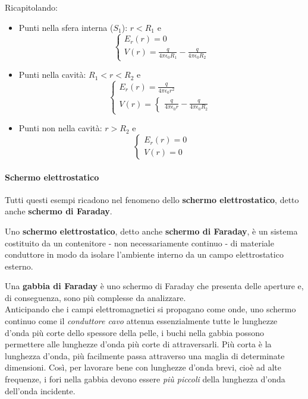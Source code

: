 Ricapitolando:
\begin{itemize}
	\item Punti nella sfera interna ($S_1$): $r<R_1$ e
	\begin{equation*}
		\begin{cases}
			E_{r}(r)=0\\
			V(r)=\frac{q}{4\pi\epsilon_0R_1}-\frac{q}{4\pi\epsilon_0R_2}
		\end{cases}
	\end{equation*}
	\item Punti nella cavità: $R_1<r<R_2$ e
	\begin{equation*}
		\begin{cases}
			E_{r}(r)=\frac{q}{4\pi\epsilon_0 r^2}\\
			V(r)=\begin{cases}
				\frac{q}{4\pi\epsilon_0r}-\frac{q}{4\pi\epsilon_0R_2}
			\end{cases}
		\end{cases}
	\end{equation*}
	\item Punti non nella cavità: $r>R_2$ e
	\begin{equation*}
		\begin{cases}
			E_{r}(r)=0\\
			V(r)=0
		\end{cases}
	\end{equation*}
\end{itemize}

\paragraph{Schermo elettrostatico}
Tutti questi esempi ricadono nel fenomeno dello \textbf{schermo elettrostatico}, detto anche \textbf{schermo di Faraday}.
\begin{define}[lol]
	Uno \textbf{schermo elettrostatico}, detto anche \textbf{schermo di Faraday}, è un sistema costituito da un contenitore - non necessariamente continuo - di materiale conduttore in modo da isolare l'ambiente interno da un campo elettrostatico esterno.
\end{define}
\begin{digressionwt}
	Una \textbf{gabbia di Faraday} è uno schermo di Faraday che presenta delle aperture e, di conseguenza, sono più complesse da analizzare.\\
	Anticipando che i campi elettromagnetici si propagano come onde, uno schermo continuo come il \textit{conduttore cavo} attenua essenzialmente tutte le lunghezze d'onda più corte dello spessore della pelle, i buchi nella gabbia possono permettere alle lunghezze d'onda più corte di attraversarli. Più corta è la lunghezza d'onda, più facilmente passa attraverso una maglia di determinate dimensioni. Così, per lavorare bene con lunghezze d'onda brevi, cioè ad alte frequenze, i fori nella gabbia devono essere \textit{più piccoli} della lunghezza d'onda dell'onda incidente.
\end{digressionwt}
